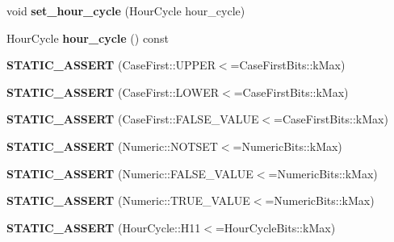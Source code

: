 \begin{DoxyCompactItemize}
void {\bfseries set\+\_\+hour\+\_\+cycle} (Hour\+Cycle hour\+\_\+cycle)
\item 
\mbox{\label{classv8_1_1internal_1_1JSLocale_aa26001c18c44ef9178a9f8a6332db892}} 
Hour\+Cycle {\bfseries hour\+\_\+cycle} () const
\item 
\mbox{\label{classv8_1_1internal_1_1JSLocale_a7b4630e8aab0cc59fe48fccbbb636ef8}} 
{\bfseries S\+T\+A\+T\+I\+C\+\_\+\+A\+S\+S\+E\+RT} (Case\+First\+::\+U\+P\+P\+ER$<$=Case\+First\+Bits\+::k\+Max)
\item 
\mbox{\label{classv8_1_1internal_1_1JSLocale_ae5051f85e8f597635c4a7ac108393a43}} 
{\bfseries S\+T\+A\+T\+I\+C\+\_\+\+A\+S\+S\+E\+RT} (Case\+First\+::\+L\+O\+W\+ER$<$=Case\+First\+Bits\+::k\+Max)
\item 
\mbox{\label{classv8_1_1internal_1_1JSLocale_aa461a878a20001eb0de62bbd302256b0}} 
{\bfseries S\+T\+A\+T\+I\+C\+\_\+\+A\+S\+S\+E\+RT} (Case\+First\+::\+F\+A\+L\+S\+E\+\_\+\+V\+A\+L\+UE$<$=Case\+First\+Bits\+::k\+Max)
\item 
\mbox{\label{classv8_1_1internal_1_1JSLocale_a649bd21bf2bfb1517f45ecaaefed143b}} 
{\bfseries S\+T\+A\+T\+I\+C\+\_\+\+A\+S\+S\+E\+RT} (Numeric\+::\+N\+O\+T\+S\+ET$<$=Numeric\+Bits\+::k\+Max)
\item 
\mbox{\label{classv8_1_1internal_1_1JSLocale_a16988075f9c1a2b02c51eaaf72a6421d}} 
{\bfseries S\+T\+A\+T\+I\+C\+\_\+\+A\+S\+S\+E\+RT} (Numeric\+::\+F\+A\+L\+S\+E\+\_\+\+V\+A\+L\+UE$<$=Numeric\+Bits\+::k\+Max)
\item 
\mbox{\label{classv8_1_1internal_1_1JSLocale_a32f7f9266f7ef31da473a621a63d3292}} 
{\bfseries S\+T\+A\+T\+I\+C\+\_\+\+A\+S\+S\+E\+RT} (Numeric\+::\+T\+R\+U\+E\+\_\+\+V\+A\+L\+UE$<$=Numeric\+Bits\+::k\+Max)
\item 
\mbox{\label{classv8_1_1internal_1_1JSLocale_a93010fe5d0c9e7c3a2d10eb80d793583}} 
{\bfseries S\+T\+A\+T\+I\+C\+\_\+\+A\+S\+S\+E\+RT} (Hour\+Cycle\+::\+H11$<$=Hour\+Cycle\+Bits\+::k\+Max)

\end{DoxyCompactItemize}
